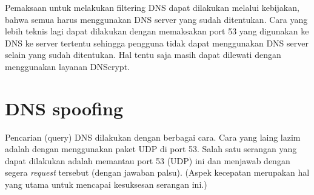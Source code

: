 Pemaksaan untuk melakukan filtering DNS dapat dilakukan melalui kebijakan,
bahwa semua harus menggunakan DNS server yang sudah ditentukan. Cara yang lebih
teknis lagi dapat dilakukan dengan memaksakan port 53 yang digunakan ke DNS ke
server tertentu sehingga pengguna tidak dapat menggunakan DNS server selain
yang sudah ditentukan. Hal tentu saja masih dapat dilewati dengan menggunakan
layanan DNScrypt.


\section{DNS spoofing}
Pencarian (query) DNS dilakukan dengan berbagai cara. Cara yang laing lazim
adalah dengan menggunakan paket UDP di port 53. Salah satu serangan yang dapat
dilakukan adalah memantau port 53 (UDP) ini dan menjawab dengan segera {\em
request} tersebut (dengan jawaban palsu). (Aspek kecepatan merupakan hal yang
utama untuk mencapai kesuksesan serangan ini.)
